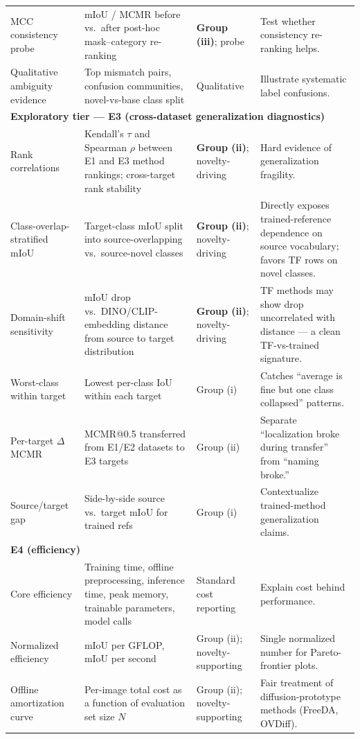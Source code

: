 \documentclass[11pt,a4paper]{article}
\begin{document}
{\begin{longtable}{p{} p{} p{} p{}}
MCC consistency probe & mIoU / MCMR before vs.\ after post-hoc mask--category re-ranking & \textbf{Group (iii)}; probe & Test whether consistency re-ranking helps. \\
Qualitative ambiguity evidence & Top mismatch pairs, confusion communities, novel-vs-base class split & Qualitative & Illustrate systematic label confusions. \\
\midrule
\multicolumn{4}{l}{\textbf{Exploratory tier --- E3 (cross-dataset generalization diagnostics)}} \\
Rank correlations & Kendall's $\tau$ and Spearman $\rho$ between E1 and E3 method rankings; cross-target rank stability & \textbf{Group (ii)}; novelty-driving & Hard evidence of generalization fragility. \\
Class-overlap-stratified mIoU & Target-class mIoU split into source-overlapping vs.\ source-novel classes & \textbf{Group (ii)}; novelty-driving & Directly exposes trained-reference dependence on source vocabulary; favors TF rows on novel classes. \\
Domain-shift sensitivity & mIoU drop vs.\ DINO/CLIP-embedding distance from source to target distribution & \textbf{Group (ii)}; novelty-driving & TF methods may show drop uncorrelated with distance --- a clean TF-vs-trained signature. \\
Worst-class within target & Lowest per-class IoU within each target & Group (i) & Catches ``average is fine but one class collapsed'' patterns. \\
Per-target $\Delta$ MCMR & MCMR@0.5 transferred from E1/E2 datasets to E3 targets & Group (ii) & Separate ``localization broke during transfer'' from ``naming broke.'' \\
Source/target gap & Side-by-side source vs.\ target mIoU for trained refs & Group (i) & Contextualize trained-method generalization claims. \\
\midrule
\multicolumn{4}{l}{\textbf{E4 (efficiency)}} \\
Core efficiency & Training time, offline preprocessing, inference time, peak memory, trainable parameters, model calls & Standard cost reporting & Explain cost behind performance. \\
Normalized efficiency & mIoU per GFLOP, mIoU per second & Group (ii); novelty-supporting & Single normalized number for Pareto-frontier plots. \\
Offline amortization curve & Per-image total cost as a function of evaluation set size $N$ & Group (ii); novelty-supporting & Fair treatment of diffusion-prototype methods (FreeDA, OVDiff). \\

\end{longtable}}
\end{document}
